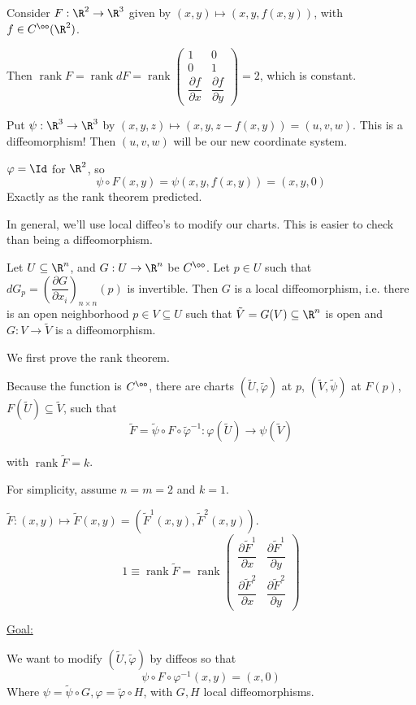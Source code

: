 \documentclass[x11names,reqno,14pt]{extarticle}
\DeclareMathOperator{\rank}{rank}
\newcommand{\pp}[2]{\dfrac{\partial #1}{\partial #2}}
\renewcommand{\phi}{\varphi}
\begin{document}
\exm

Consider $F:\R^2\to\R^3$ given by $(x, y)\mapsto (x, y, f(x, y))$, with $f\in C^\oo(\R^2)$. 

Then $\rank F = \rank dF = \rank \begin{pmatrix} 1 & 0 \\ 0 & 1 \\ \pp{f}{x} & \pp{f}{y} \end{pmatrix} = 2$, which is constant. 

Put $\psi:\R^3\to\R^3$ by  $(x, y, z) \mapsto (x, y, z - f(x, y)) = (u, v, w)$. This is a diffeomorphism! Then $(u, v, w)$ will be our new coordinate system.

$\phi = \Id$ for $\R^2$, so 
\[
\psi\circ F(x, y) = \psi(x, y, f(x, y)) = (x, y, 0)
\]
Exactly as the rank theorem predicted. 

In general, we'll use local diffeo's to modify our charts. This is easier to check than being a diffeomorphism. 


Let $U \subseteq \R^n$, and $G:U\to\R^n$ be $C^\oo$. Let $p \in U$ such that $dG_p = \left(\pp{G}{x_i}\right)_{n\times n}(p)$ is invertible. Then $G$ is a local diffeomorphism, i.e. there is an open neighborhood $p \in V \subseteq U$ such that $\tilde{V} = G(V)\subseteq\R^n$ is open and $G:V\to\tilde{V}$ is a diffeomorphism.

\proof

We first prove the rank theorem. 

Because the function is $C^\oo$, there are charts $(\tilde{U},\tilde{\phi})$ at $p$, $(\tilde{V},\tilde{\psi})$ at $F(p)$, $F(\tilde{U})\subseteq \tilde{V}$, such that
\[
\tilde{F} = \tilde{\psi}\circ F \circ \tilde{\phi}^{-1}:\phi(\tilde{U})\to \psi(\tilde{V})
\]

with $\rank \tilde{F} = k$. 

For simplicity, assume $n = m = 2$ and $k = 1$. 

$\tilde{F}:(x,y)\mapsto \tilde{F}(x, y) = (\tilde{F}^1(x, y), \tilde{F}^2(x, y))$. 
\[
1\equiv\rank \tilde{F} = \rank\begin{pmatrix} \pp{\tilde{F}^1}{x} & \pp{\tilde{F}^1}{y} \\ \pp{\tilde{F}^2}{x} & \pp{\tilde{F}^2}{y} \end{pmatrix}
\]

\underline{Goal:}

We want to modify $(\tilde{U},\tilde{\phi})$ by diffeos so that 
\[
\psi \circ F \circ \phi^{-1} (x, y) = (x, 0)
\]
Where $\psi = \tilde{\psi}\circ G, \phi = \tilde{\phi} \circ H$, with $G, H$ local diffeomorphisms.
\end{document}
